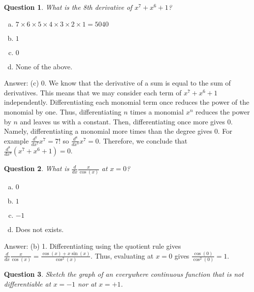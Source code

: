 \documentclass[10pt]{article}
\newtheorem{quiz}{Question}
\begin{document}
\begin{multicols}{2}
\vspace{5mm}

\begin{quiz} What is the 8th derivative of $x^7+x^6+1$?
\end{quiz}
\begin {enumerate}[(a)]
\item $7 \times 6 \times 5 \times 4 \times 3 \times 2 \times 1 = 5040$
\item $1$
\item $0$
\item None of the above.
\end{enumerate}
\vspace{0.5 cm}

Answer: (c) 0. We know that the derivative of a sum is equal to the sum of derivatives. This means that we may consider each term of $x^7 + x^6 + 1$ independently. Differentiating each monomial term once reduces the power of the monomial by one. Thus, differentiating $n$ times a monomial $x^n$ reduces the power by $n$ and leaves us with a constant. Then, differentiating once more gives 0. Namely, differentiating a monomial more times than the degree gives 0. For example $\frac{d^7}{dx^7}x^7 = 7!$ so $\frac{d^8}{dx^8}x^7 = 0$. Therefore, we conclude that $\frac{d^8}{dx^8}(x^7 + x^6 + 1) = 0$.  

\vspace{5mm}

\begin{quiz} What is $\frac{d}{dx}\frac{x}{\cos(x)}$ at $x=0$?
\end{quiz}
\begin {enumerate}[(a)]
\item $0$
\item $1$
\item $-1$
\item Does not exists.
\end{enumerate}

\vspace{0.5 cm}

Answer: (b) 1. Differentiating using the quotient rule gives $\frac{d}{dx}\frac{x}{\cos(x)} = \frac{\cos(x) + x\sin(x)}{\cos^2(x)}$. Thus, evaluating at $x=0$ gives $\frac{\cos(0)}{\cos^2(0)} = 1$.

\vspace{5mm}

\begin{quiz} Sketch the graph of an everywhere continuous function that is not differentiable at $x = -1$ nor at $x = +1$.
\end{quiz}
\vspace{0.5 cm}


\end{multicols}
\end{document}
